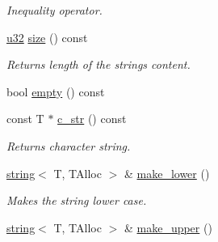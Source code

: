 \begin{DoxyCompactItemize}
\begin{DoxyCompactList}\small\item\em Inequality operator. \end{DoxyCompactList}\item 
\hyperlink{namespaceirr_a0416a53257075833e7002efd0a18e804}{u32} \hyperlink{classirr_1_1core_1_1string_a062f23675d892012c7e8d5d4e92ecd00}{size} () const 
\begin{DoxyCompactList}\small\item\em Returns length of the string\textquotesingle{}s content. \end{DoxyCompactList}\item 
bool \hyperlink{classirr_1_1core_1_1string_a98485a13c490634eb646eb523f6fc6cb}{empty} () const 
\item 
const T $\ast$ \hyperlink{classirr_1_1core_1_1string_a4abad222c478c108096ee9297870068c}{c\+\_\+str} () const 
\begin{DoxyCompactList}\small\item\em Returns character string. \end{DoxyCompactList}\item 
\hyperlink{classirr_1_1core_1_1string}{string}$<$ T, T\+Alloc $>$ \& \hyperlink{classirr_1_1core_1_1string_ac3d457d0be72202e553581460fb5142c}{make\+\_\+lower} ()\hypertarget{classirr_1_1core_1_1string_ac3d457d0be72202e553581460fb5142c}{}\label{classirr_1_1core_1_1string_ac3d457d0be72202e553581460fb5142c}

\begin{DoxyCompactList}\small\item\em Makes the string lower case. \end{DoxyCompactList}\item 
\hyperlink{classirr_1_1core_1_1string}{string}$<$ T, T\+Alloc $>$ \& \hyperlink{classirr_1_1core_1_1string_aabd36a765f51557070c300f45996432c}{make\+\_\+upper} ()\hypertarget{classirr_1_1core_1_1string_aabd36a765f51557070c300f45996432c}{}\label{classirr_1_1core_1_1string_aabd36a765f51557070c300f45996432c}


\end{DoxyCompactItemize}
